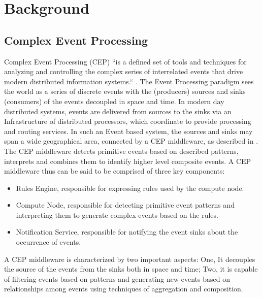 \chapter{Background} 

\section{Complex Event Processing}
Complex Event Processing (CEP) ``is a defined set of tools and techniques for analyzing and controlling the complex series of interrelated events that drive modern distributed information systems.`` \citep{NpForMasses}. The Event Processing paradigm sees the world as a series of discrete events with the (producers) sources and sinks (consumers) of the events decoupled in space and time. In modern day distributed systems, events are delivered from sources to the sinks via an Infrastructure of distributed processors, which coordinate to provide processing and routing services. In such an Event based system, the sources and sinks may span a wide geographical area, connected by a CEP middleware, as described in \cite{Cugola}. The CEP middleware detects primitive events based on described patterns, interprets and combines them to identify higher level composite events. A CEP middleware thus can be said to be comprised of three key components:
\begin{itemize}
	\item  Rules Engine, responsible for expressing rules used by the compute node.
	\item  Compute Node, responsible for detecting primitive event patterns and interpreting them to generate complex events based on the rules.
	\item Notification Service, responsible for notifying the event sinks about the occurrence of events.
\end{itemize}
A CEP middleware is characterized by two important aspects: One, It decouples the source of the events from the sinks both in space and time; Two, it is capable of filtering events based on patterns and generating new events based on relationships among events using techniques of aggregation and composition. 

